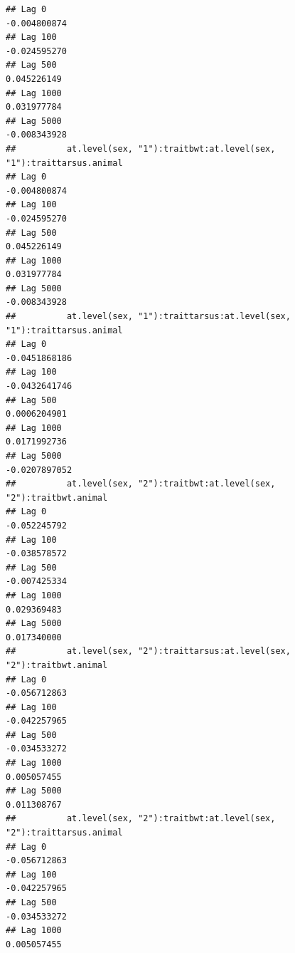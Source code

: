 \documentclass[
  12pt,
]{book}
\begin{document}
\begin{verbatim}
## Lag 0                                                         -0.004800874
## Lag 100                                                       -0.024595270
## Lag 500                                                        0.045226149
## Lag 1000                                                       0.031977784
## Lag 5000                                                      -0.008343928
##          at.level(sex, "1"):traitbwt:at.level(sex, "1"):traittarsus.animal
## Lag 0                                                         -0.004800874
## Lag 100                                                       -0.024595270
## Lag 500                                                        0.045226149
## Lag 1000                                                       0.031977784
## Lag 5000                                                      -0.008343928
##          at.level(sex, "1"):traittarsus:at.level(sex, "1"):traittarsus.animal
## Lag 0                                                           -0.0451868186
## Lag 100                                                         -0.0432641746
## Lag 500                                                          0.0006204901
## Lag 1000                                                         0.0171992736
## Lag 5000                                                        -0.0207897052
##          at.level(sex, "2"):traitbwt:at.level(sex, "2"):traitbwt.animal
## Lag 0                                                      -0.052245792
## Lag 100                                                    -0.038578572
## Lag 500                                                    -0.007425334
## Lag 1000                                                    0.029369483
## Lag 5000                                                    0.017340000
##          at.level(sex, "2"):traittarsus:at.level(sex, "2"):traitbwt.animal
## Lag 0                                                         -0.056712863
## Lag 100                                                       -0.042257965
## Lag 500                                                       -0.034533272
## Lag 1000                                                       0.005057455
## Lag 5000                                                       0.011308767
##          at.level(sex, "2"):traitbwt:at.level(sex, "2"):traittarsus.animal
## Lag 0                                                         -0.056712863
## Lag 100                                                       -0.042257965
## Lag 500                                                       -0.034533272
## Lag 1000                                                       0.005057455

\end{verbatim}
\end{document}
